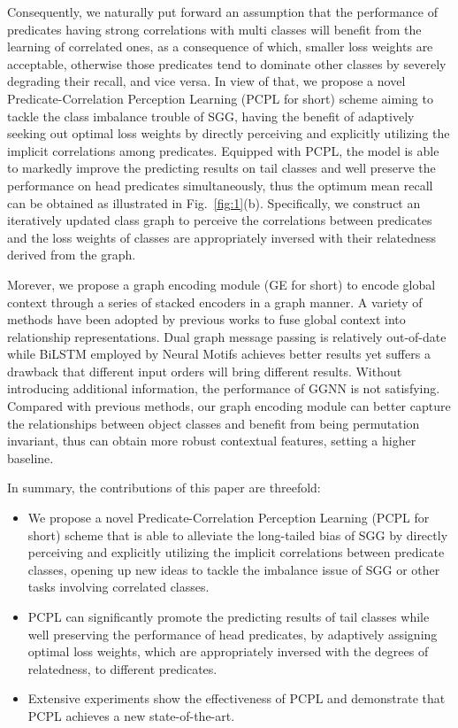 \documentclass[sigconf]{acmart}
\begin{document}
Consequently, we naturally put forward an assumption that the performance of predicates having strong correlations with multi classes will benefit from the learning of correlated ones, as a consequence of which, smaller loss weights are acceptable, otherwise those predicates tend to dominate other classes by severely degrading their recall, and vice versa. In view of that, we propose a novel Predicate-Correlation Perception Learning (PCPL for short) scheme aiming to tackle the class imbalance trouble of SGG, having the benefit of adaptively seeking out optimal loss weights by directly perceiving and explicitly utilizing the implicit correlations among predicates. Equipped with PCPL, the model is able to markedly improve the predicting results on tail classes and well preserve the performance on head predicates simultaneously, thus the optimum mean recall can be obtained as illustrated in Fig.~\ref{fig:1}(b). 
Specifically, we construct an iteratively updated class graph to perceive the correlations between predicates and the loss weights of classes are appropriately inversed with their relatedness derived from the graph.

Morever, we propose a graph encoding module (GE for short) to encode global context through a series of stacked encoders in a graph manner. A variety of methods have been adopted by previous works to fuse global context into relationship representations. Dual graph message passing\cite{xu17} is relatively out-of-date while BiLSTM\cite{hochreiter97} employed by Neural Motifs\cite{zellers18} achieves better results yet suffers a drawback that different input orders will bring different results. Without introducing additional information, the performance of GGNN \cite{chen19} is not satisfying. Compared with previous methods, our graph encoding module can better capture the relationships between object classes and benefit from being permutation invariant, thus can obtain more robust contextual features, setting a higher baseline. 

In summary, the contributions of this paper are threefold:
\begin{itemize}
    \item We propose a novel Predicate-Correlation Perception Learning (PCPL for short) scheme that is able to alleviate the long-tailed bias of SGG by directly perceiving and explicitly utilizing the implicit correlations between predicate classes, opening up new ideas to tackle the imbalance issue of SGG or other tasks involving correlated classes.
    \item PCPL can significantly promote the predicting results of tail classes while well preserving the performance of head predicates, by adaptively assigning optimal loss weights, which are appropriately inversed with the degrees of relatedness, to different predicates.
    \item Extensive experiments show the effectiveness of PCPL and demonstrate that PCPL achieves a new state-of-the-art.
\end{itemize}
\end{document}
